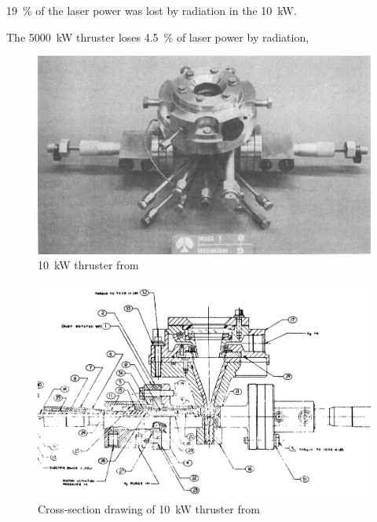         \qty{19}{\%} of the laser power was lost by radiation in the \qty{10}{kW}. 
        
        The \qty{5000}{kW} thruster loses \qty{4.5}{\%} of laser power by radiation, 

        \begin{figure}[!ht]
            \centering
            \includegraphics[width=\textwidth]{assets/2 background/Shoji_assy.png}
            \caption{\qty{10}{kW} thruster from \textcite{shojiPerformanceHeatTransfer1976a}}
            \label{fig:Shoji apparatus}
        \end{figure}

        \begin{figure}[!ht]
            \centering
            \includegraphics[width=\textwidth]{assets/2 background/Shoji cross-section.png}
            \caption{Cross-section drawing of \qty{10}{kW} thruster from \textcite{shojiLaserheatedRocketThruster1977}}
            \label{fig:Shoji cross-section}
        \end{figure}

